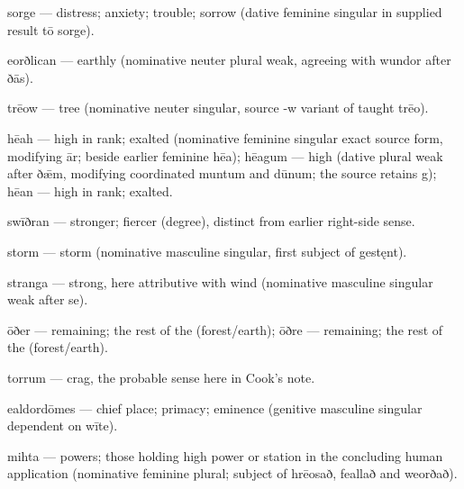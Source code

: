 sorge — distress; anxiety; trouble; sorrow (dative feminine singular in supplied result tō sorge).

eorðlican — earthly (nominative neuter plural weak, agreeing with wundor after ðās).

trēow — tree (nominative neuter singular, source -w variant of taught trēo).

hēah — high in rank; exalted (nominative feminine singular exact source form, modifying ār; beside earlier feminine hēa); hēagum — high (dative plural weak after ðǣm, modifying coordinated muntum and dūnum; the source retains g); hēan — high in rank; exalted.

swīðran — stronger; fiercer (degree), distinct from earlier right-side sense.

storm — storm (nominative masculine singular, first subject of gestęnt).

stranga — strong, here attributive with wind (nominative masculine singular weak after se).

ōðer — remaining; the rest of the (forest/\allowbreak{}earth); ōðre — remaining; the rest of the (forest/\allowbreak{}earth).

torrum — crag, the probable sense here in Cook’s note.

ealdordōmes — chief place; primacy; eminence (genitive masculine singular dependent on wīte).

mihta — powers; those holding high power or station in the concluding human application (nominative feminine plural; subject of hrēosað, feallað and weorðað).

